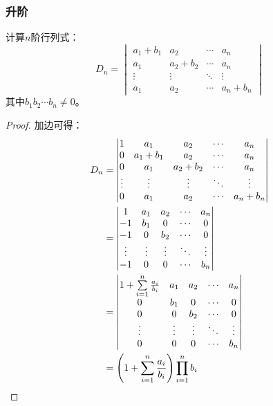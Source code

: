 \subsubsection{升阶}
\begin{theorem}
	计算$n$阶行列式：
	\begin{equation*}
		D_n=
		\begin{vmatrix}
			a_1+b_1 & a_2 &\cdots & a_n \\
			a_1 & a_2+b_2 & \cdots & a_n \\
			\vdots & \vdots & \ddots & \vdots \\
			a_1 & a_2 & \cdots & a_n+b_n
		\end{vmatrix}
	\end{equation*}
	其中$b_1b_2\cdots b_n\ne0$。
\end{theorem}
\begin{proof}
	加边可得：
	\begin{align*}
		D_n&=
		\begin{vmatrix}
			1 & a_1 & a_2 & \cdots & a_n \\
			0 & a_1+b_1 & a_2 &\cdots & a_n \\
			0 & a_1 & a_2+b_2 & \cdots & a_n \\
			\vdots & \vdots & \vdots & \ddots & \vdots \\
			0 & a_1 & a_2 & \cdots & a_n+b_n
		\end{vmatrix} \\
		&=
		\begin{vmatrix}
			1 & a_1 & a_2 & \cdots & a_n \\
			-1 & b_1 & 0 &\cdots & 0 \\
			-1 & 0 & b_2 & \cdots & 0 \\
			\vdots & \vdots & \vdots & \ddots & \vdots \\
			-1 & 0 & 0 & \cdots & b_n
		\end{vmatrix} \\
		&=
		\begin{vmatrix}
			1+\sum\limits_{i=1}^{n}\frac{a_i}{b_i} & a_1 & a_2 & \cdots & a_n \\
			0 & b_1 & 0 &\cdots & 0 \\
			0 & 0 & b_2 & \cdots & 0 \\
			\vdots & \vdots & \vdots & \ddots & \vdots \\
			0 & 0 & 0 & \cdots & b_n
		\end{vmatrix} \\
		&=\left(1+\sum_{i=1}^{n}\frac{a_i}{b_i}\right)\prod_{i=1}^nb_i\qedhere
	\end{align*}
\end{proof}
